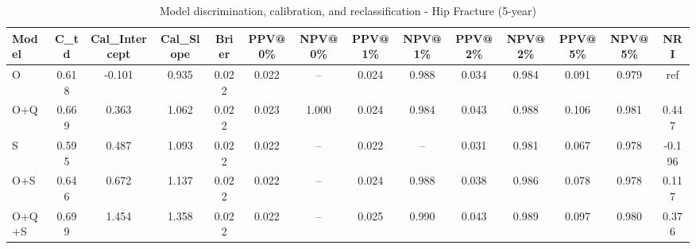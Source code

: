 \begin{table}[htbp]
\centering
\small
\caption{Model discrimination, calibration, and reclassification - Hip Fracture (5-year)}
\label{tab:perf_pd_5y}
\begin{tabular}{lccccccccccccc}
\toprule
Model & C\_td & Cal\_Intercept & Cal\_Slope & Brier & PPV@0\% & NPV@0\% & PPV@1\% & NPV@1\% & PPV@2\% & NPV@2\% & PPV@5\% & NPV@5\% & NRI \\
\midrule
O & 0.618 & -0.101 & 0.935 & 0.022 & 0.022 & -- & 0.024 & 0.988 & 0.034 & 0.984 & 0.091 & 0.979 & ref \\
O+Q & 0.669 & 0.363 & 1.062 & 0.022 & 0.023 & 1.000 & 0.024 & 0.984 & 0.043 & 0.988 & 0.106 & 0.981 & 0.447 \\
S & 0.595 & 0.487 & 1.093 & 0.022 & 0.022 & -- & 0.022 & -- & 0.031 & 0.981 & 0.067 & 0.978 & -0.196 \\
O+S & 0.646 & 0.672 & 1.137 & 0.022 & 0.022 & -- & 0.024 & 0.988 & 0.038 & 0.986 & 0.078 & 0.978 & 0.117 \\
O+Q+S & 0.699 & 1.454 & 1.358 & 0.022 & 0.022 & -- & 0.025 & 0.990 & 0.043 & 0.989 & 0.097 & 0.980 & 0.376 \\
\bottomrule
\end{tabular}
\end{table}